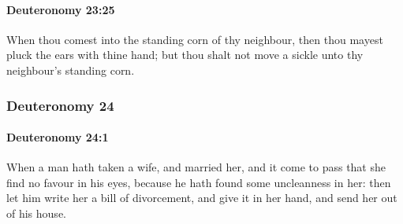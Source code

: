 		\paragraph{Deuteronomy 23:25} %
			\label{DEUTERONOMY-23-25}

			When thou comest into the standing corn of thy neighbour, then thou mayest pluck the ears with thine hand; but thou shalt not move a sickle unto thy neighbour's standing corn.

	\subsubsection{Deuteronomy 24} %
		\label{DEUTERONOMY-24}

		\paragraph{Deuteronomy 24:1} %
			\label{DEUTERONOMY-24-1}

			When a man hath taken a wife, and married her, and it come to pass that she find no favour in his eyes, because he hath found some uncleanness in her: then let him write her a bill of divorcement, and give it in her hand, and send her out of his house.

